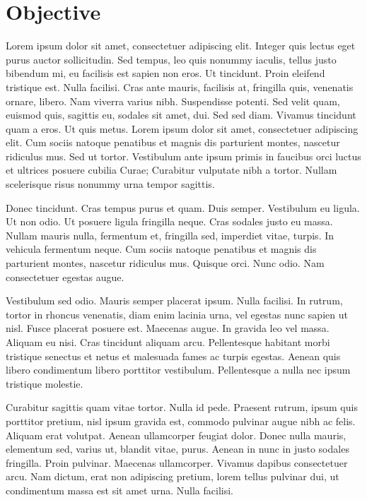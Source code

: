 \section{Objective}
Lorem ipsum dolor sit amet, consectetuer adipiscing elit. Integer quis lectus eget purus auctor sollicitudin. Sed tempus, leo quis nonummy iaculis, tellus justo bibendum mi, eu facilisis est sapien non eros. Ut tincidunt. Proin eleifend tristique est. Nulla facilisi. Cras ante mauris, facilisis at, fringilla quis, venenatis ornare, libero. Nam viverra varius nibh. Suspendisse potenti. Sed velit quam, euismod quis, sagittis eu, sodales sit amet, dui. Sed sed diam. Vivamus tincidunt quam a eros. Ut quis metus. Lorem ipsum dolor sit amet, consectetuer adipiscing elit. Cum sociis natoque penatibus et magnis dis parturient montes, nascetur ridiculus mus. Sed ut tortor. Vestibulum ante ipsum primis in faucibus orci luctus et ultrices posuere cubilia Curae; Curabitur vulputate nibh a tortor. Nullam scelerisque risus nonummy urna tempor sagittis.

Donec tincidunt. Cras tempus purus et quam. Duis semper. Vestibulum eu ligula. Ut non odio. Ut posuere ligula fringilla neque. Cras sodales justo eu massa. Nullam mauris nulla, fermentum et, fringilla sed, imperdiet vitae, turpis. In vehicula fermentum neque. Cum sociis natoque penatibus et magnis dis parturient montes, nascetur ridiculus mus. Quisque orci. Nunc odio. Nam consectetuer egestas augue.

Vestibulum sed odio. Mauris semper placerat ipsum. Nulla facilisi. In rutrum, tortor in rhoncus venenatis, diam enim lacinia urna, vel egestas nunc sapien ut nisl. Fusce placerat posuere est. Maecenas augue. In gravida leo vel massa. Aliquam eu nisi. Cras tincidunt aliquam arcu. Pellentesque habitant morbi tristique senectus et netus et malesuada fames ac turpis egestas. Aenean quis libero condimentum libero porttitor vestibulum. Pellentesque a nulla nec ipsum tristique molestie.

Curabitur sagittis quam vitae tortor. Nulla id pede. Praesent rutrum, ipsum quis porttitor pretium, nisl ipsum gravida est, commodo pulvinar augue nibh ac felis. Aliquam erat volutpat. Aenean ullamcorper feugiat dolor. Donec nulla mauris, elementum sed, varius ut, blandit vitae, purus. Aenean in nunc in justo sodales fringilla. Proin pulvinar. Maecenas ullamcorper. Vivamus dapibus consectetuer arcu. Nam dictum, erat non adipiscing pretium, lorem tellus pulvinar dui, ut condimentum massa est sit amet urna. Nulla facilisi.

